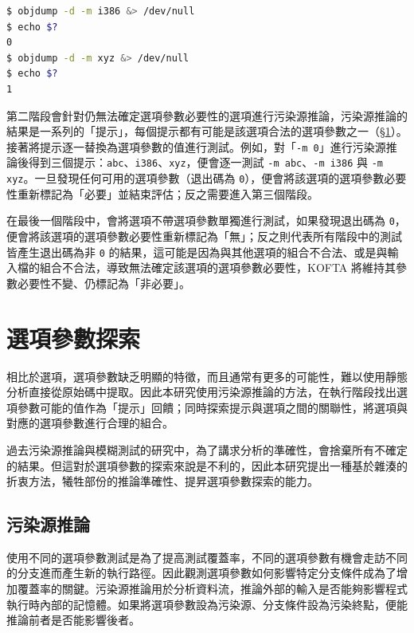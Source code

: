 \begin{lstlisting}[language=sh, caption=程式退出碼範例二, label=lst:exit-code-2]
$ objdump -d -m i386 &> /dev/null
$ echo $?                                        
0
$ objdump -d -m xyz &> /dev/null
$ echo $?                                        
1
\end{lstlisting}

第二階段會針對仍無法確定選項參數必要性的選項進行污染源推論，污染源推論的結果是一系列的「提示」，每個提示都有可能是該選項合法的選項參數之一（\S \ref{sec:args-explo}）。接著將提示逐一替換為選項參數的值進行測試。例如，對「\texttt{-m 0}」進行污染源推論後得到三個提示：\texttt{abc}、\texttt{i386}、\texttt{xyz}，便會逐一測試 \texttt{-m abc}、\texttt{-m i386} 與 \texttt{-m xyz}。一旦發現任何可用的選項參數（退出碼為 \texttt{0}），便會將該選項的選項參數必要性重新標記為「必要」並結束評估；反之需要進入第三個階段。

在最後一個階段中，會將選項不帶選項參數單獨進行測試，如果發現退出碼為 \texttt{0}，便會將該選項的選項參數必要性重新標記為「無」；反之則代表所有階段中的測試皆產生退出碼為非 \texttt{0} 的結果，這可能是因為與其他選項的組合不合法、或是與輸入檔的組合不合法，導致無法確定該選項的選項參數必要性，KOFTA 將維持其參數必要性不變、仍標記為「非必要」。

\section{選項參數探索}
\label{sec:args-explo}

相比於選項，選項參數缺乏明顯的特徵，而且通常有更多的可能性，難以使用靜態分析直接從原始碼中提取。因此本研究使用污染源推論的方法，在執行階段找出選項參數可能的值作為「提示」回饋；同時探索提示與選項之間的關聯性，將選項與對應的選項參數進行合理的組合。

過去污染源推論與模糊測試的研究中，為了講求分析的準確性，會捨棄所有不確定的結果。但這對於選項參數的探索來說是不利的，因此本研究提出一種基於雜湊的折衷方法，犧牲部份的推論準確性、提昇選項參數探索的能力。

\subsection{污染源推論}

使用不同的選項參數測試是為了提高測試覆蓋率，不同的選項參數有機會走訪不同的分支進而產生新的執行路徑。因此觀測選項參數如何影響特定分支條件成為了增加覆蓋率的關鍵。污染源推論用於分析資料流，推論外部的輸入是否能夠影響程式執行時內部的記憶體。如果將選項參數設為污染源、分支條件設為污染終點，便能推論前者是否能影響後者。

